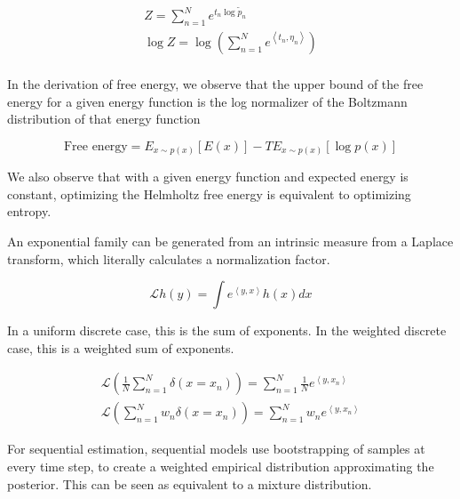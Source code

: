 \documentclass[a4paper]{article}
\begin{document}
\begin{equation}
  \begin{split}
    Z = \sum_{n=1}^N e^{ t_n \log \tilde{p}_n } \\
    \log Z = \log \left( \sum_{n=1}^N e^{ \left< t_n, \eta_n \right> } \right) \\
  \end{split}
  \label{}
\end{equation}

In the derivation of free energy, we observe that the upper bound of the free energy for a given energy function is the log normalizer of the Boltzmann distribution of that energy function

\begin{equation}
  \text{Free energy} = E_{x \sim p(x)} \left[ E(x) \right] - T E_{ x \sim p(x) } \left[ \log p(x) \right]
  \label{}
\end{equation}

We also observe that with a given energy function and expected energy is constant, optimizing the Helmholtz free energy is equivalent to optimizing entropy.

An exponential family can be generated from an intrinsic measure from a Laplace transform, which literally calculates a normalization factor.

\begin{equation}
  \mathcal{L} h(y) = \int e^{ \left< y, x \right> } h(x) dx
  \label{}
\end{equation}

In a uniform discrete case, this is the sum of exponents.  In the weighted discrete case, this is a weighted sum of exponents.

\begin{equation}
  \begin{split}
    \mathcal{L} \left( \frac{1}{N} \sum_{n=1}^N \delta\left( x = x_n \right) \right) = \sum_{n=1}^N \frac{1}{N} e^{ \left< y, x_n \right> } \\
    \mathcal{L} \left( \sum_{n=1}^N w_n \delta\left( x = x_n \right) \right) = \sum_{n=1}^N w_n e^{ \left< y, x_n \right> }
    \label{}
  \end{split}
  \label{}
\end{equation}

For sequential estimation, sequential models use bootstrapping of samples at every time step, to create a weighted empirical distribution approximating the posterior.  
This can be seen as equivalent to a mixture distribution.
\end{document}
